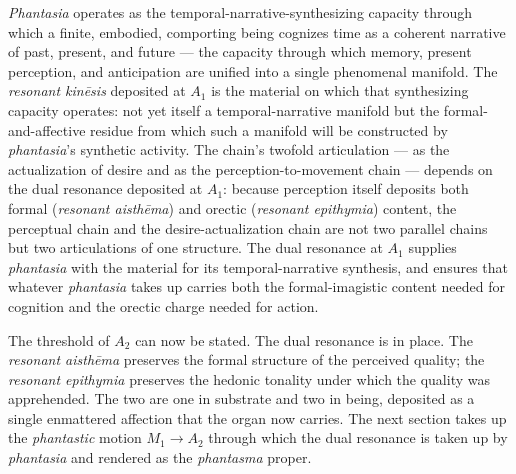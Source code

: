 \documentclass{article}
\begin{document}
\textit{Phantasia} operates as the temporal-narrative-synthesizing capacity through which a finite, embodied, comporting being cognizes time as a coherent narrative of past, present, and future --- the capacity through which memory, present perception, and anticipation are unified into a single phenomenal manifold. The \textit{resonant kinēsis} deposited at $A_1$ is the material on which that synthesizing capacity operates: not yet itself a temporal-narrative manifold but the formal-and-affective residue from which such a manifold will be constructed by \textit{phantasia}'s synthetic activity. The chain's twofold articulation --- as the actualization of desire and as the perception-to-movement chain --- depends on the dual resonance deposited at $A_1$: because perception itself deposits both formal (\textit{resonant aisthēma}) and orectic (\textit{resonant epithymia}) content, the perceptual chain and the desire-actualization chain are not two parallel chains but two articulations of one structure. The dual resonance at $A_1$ supplies \textit{phantasia} with the material for its temporal-narrative synthesis, and ensures that whatever \textit{phantasia} takes up carries both the formal-imagistic content needed for cognition and the orectic charge needed for action.

The threshold of $A_2$ can now be stated. The dual resonance is in place. The \textit{resonant aisthēma} preserves the formal structure of the perceived quality; the \textit{resonant epithymia} preserves the hedonic tonality under which the quality was apprehended. The two are one in substrate and two in being, deposited as a single enmattered affection that the organ now carries. The next section takes up the \textit{phantastic} motion $M_1 \rightarrow A_2$ through which the dual resonance is taken up by \textit{phantasia} and rendered as the \textit{phantasma} proper.
\end{document}
